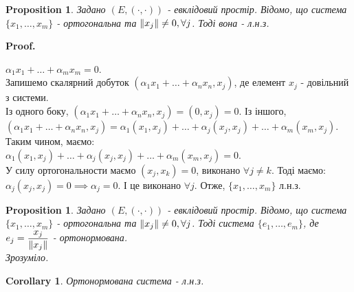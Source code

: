 \documentclass[a4paper, 10pt]{article}
\makeatletter
\def\qed{$\blacksquare$}
\theoremstyle{theoremdd}
\theoremstyle{theoremdd}
\theoremstyle{theoremdd}
\theoremstyle{theoremdd}
\theoremstyle{theoremdd}
\newtheorem{proposition}[theorem]{Proposition}
\theoremstyle{theoremdd}
\theoremstyle{theoremdd}
\theoremstyle{theoremdd}
\newtheorem{corollary}[theorem]{Corollary}
\renewenvironment{proof}[1][Proof.\\]{\par
\pushQED{\hfill \qed}%
\normalfont \topsep6\p@\@plus6\p@\relax
\trivlist
\item\relax
{\bfseries
#1\@addpunct{.}}\hspace\labelsep\ignorespaces
}{%
\popQED\endtrivlist\@endpefalse
}
\makeatother
\begin{document}
\begin{proposition}
Задано $(E,(\cdot,\cdot))$ - евклідовий простір. Відомо, що система $\{x_1,\dots,x_m\}$ - ортогональна та $\norm{x_j} \neq 0, \forall j$. Тоді вона - л.н.з.
\end{proposition}

\begin{proof}
$\alpha_1 x_1 + \dots + \alpha_m x_m = 0$.\\
Запишемо скалярний добуток $(\alpha_1 x_1 + \dots + \alpha_n x_n, x_j)$, де елемент $x_j$ - довільний з системи.\\
Із одного боку, $(\alpha_1 x_1 + \dots + \alpha_n x_n, x_j) = (0,x_j) = 0$. Із іншого,\\
$(\alpha_1 x_1 + \dots + \alpha_n x_n, x_j) = \alpha_1 (x_1,x_j) + \dots + \alpha_j (x_j,x_j) + \dots + \alpha_m (x_m,x_j)$.\\
Таким чином, маємо:\\
$\alpha_1 (x_1,x_j) + \dots + \alpha_j (x_j,x_j) + \dots + \alpha_m (x_m,x_j) = 0$.\\
У силу ортогональности маємо $(x_j,x_k) = 0$, виконано $\forall j \neq k$. Тоді маємо:\\
$\alpha_j (x_j,x_j) = 0 \implies \alpha_j = 0$.
І це виконано $\forall j$. Отже, $\{x_1,\dots,x_m\}$ л.н.з.
\end{proof}

\begin{proposition}
Задано $(E,(\cdot,\cdot))$ - евклідовий простір. Відомо, що система $\{x_1,\dots,x_m\}$ - ортогональна та $\norm{x_j} \neq 0, \forall j$. Тоді система $\{e_1,\dots,e_m\}$, де $e_j = \dfrac{x_j}{\norm{x_j}}$ - ортонормована.\\
\textit{Зрозуміло.}
\end{proposition}

\begin{corollary}
Ортонормована система - л.н.з.
\end{corollary}
\end{document}
